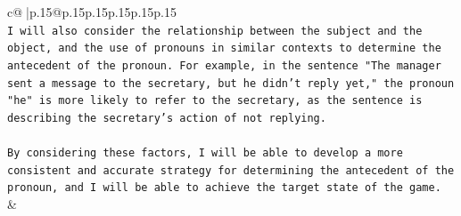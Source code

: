 \documentclass{article}
\begin{document}
{\begin{supertabular}{c@{$\;$}|p{.15\linewidth}@{}p{.15\linewidth}p{.15\linewidth}p{.15\linewidth}p{.15\linewidth}p{.15\linewidth}}
{{{\\ 
\texttt{I will also consider the relationship between the subject and the object, and the use of pronouns in similar contexts to determine the antecedent of the pronoun. For example, in the sentence "The manager sent a message to the secretary, but he didn't reply yet," the pronoun "he" is more likely to refer to the secretary, as the sentence is describing the secretary's action of not replying.} \\
\\ 
\texttt{By considering these factors, I will be able to develop a more consistent and accurate strategy for determining the antecedent of the pronoun, and I will be able to achieve the target state of the game.} \\
            }
        }
    }
    & \\ \\

\end{supertabular}
}
\end{document}
